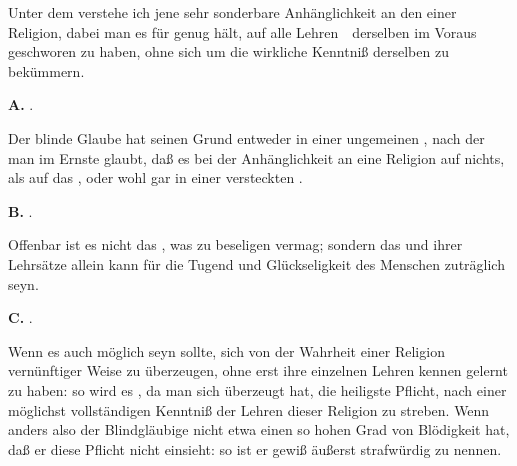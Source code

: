 Unter dem  verstehe ich jene sehr sonderbare Anhänglichkeit an den  einer Religion, dabei man es für genug hält, auf alle Lehren~\ derselben im Voraus geschworen zu haben, ohne sich um die wirkliche Kenntniß derselben zu bekümmern.\par
\vabst \textbf{A.} .\par
Der blinde Glaube hat seinen Grund entweder in einer ungemeinen , nach der man im Ernste glaubt, daß es bei der Anhänglichkeit an eine Religion auf nichts, als auf das , oder wohl gar in einer versteckten .\par
\vabst \textbf{B.} .\par
Offenbar ist es nicht das , was zu beseligen vermag; sondern das  und  ihrer Lehrsätze allein kann für die Tugend und Glückseligkeit des Menschen zuträglich seyn.\par
\vabst \textbf{C.} .\par
Wenn es auch möglich seyn sollte, sich von der Wahrheit einer Religion vernünftiger Weise zu überzeugen, ohne erst ihre einzelnen Lehren kennen gelernt zu haben: so wird es , da man sich überzeugt hat, die heiligste Pflicht, nach einer möglichst vollständigen Kenntniß der Lehren dieser Religion zu streben. Wenn anders also der Blindgläubige nicht etwa einen so hohen Grad von Blödigkeit hat, daß er diese Pflicht nicht einsieht: so ist er gewiß äußerst strafwürdig zu nennen.

